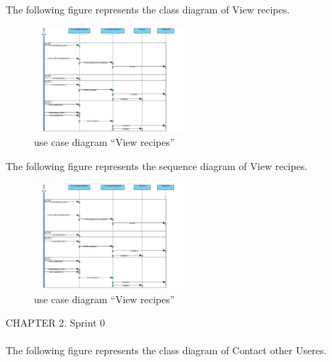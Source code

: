 \documentclass{article}
\begin{document}
{{{{{{{{The following figure represents the class diagram of View recipes.\\

\begin{figure}[htbp]
    \centering
    \includegraphics[width=0.5\textwidth]{autdia}
    \caption{use case diagram “View recipes”}
    \label{fig:design2}
\end{figure}
The following figure represents the sequence diagram of View recipes.\\
\begin{figure}[htbp]
    \centering
    \includegraphics[width=0.5\textwidth]{autdia}
    \caption{use case diagram “View recipes”}
    \label{fig:design2}
\end{figure}
\newpage
\noindent
CHAPTER 2.  Sprint 0 \\
\underline{\hspace{\textwidth}} \vspace{0.2cm}\\
The following figure represents the class diagram of Contact other Useres.\\

}}}}}}}}
\end{document}
